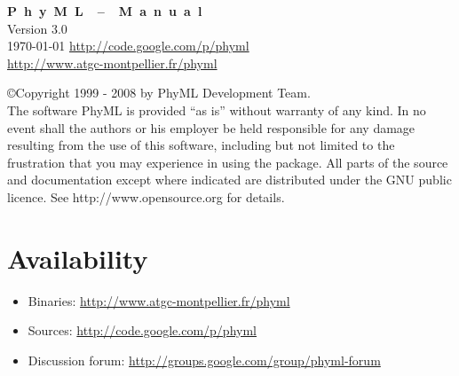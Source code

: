 \documentclass[a4paper,12pt]{article}
\begin{document}
\sloppy
\begin{center}
\thispagestyle{empty}
\vfill\vfill
{\Huge \textbf{ P~h~y~M~L~~--~~M~a~n~u~a~l}}
\vspace{-0.4cm}\\
\vfill
{\huge Version 3.0 \\
\today
\vfill
\normalsize
\href{http://code.google.com/p/phyml}{http://code.google.com/p/phyml}\\
\vspace{0.4cm}
\href{http://www.atgc-montpellier.fr/phyml}{http://www.atgc-montpellier.fr/phyml}}
\end{center}
\clearpage
\tableofcontents
\clearpage

{\par
\small 
\noindent
\copyright Copyright 1999 - 2008 by PhyML Development Team.\\
\noindent The software PhyML is provided ``as is''  without warranty of any kind.  In no event shall
the authors  or his  employer be  held responsible  for any damage  resulting from  the use  of this
software, including but not limited to the frustration that you may experience in using the package.
All parts of the source and documentation except where indicated are distributed under
the GNU public licence. See http://www.opensource.org for details.

}

{
\noindent
\setlength{\baselineskip}{0.5\baselineskip}
\section{Availability}
\begin{itemize}
\item Binaries: \href{http://www.atgc-montpellier.fr/phyml}{http://www.atgc-montpellier.fr/phyml}
\item Sources: \href{http://code.google.com/p/phyml}{http://code.google.com/p/phyml}
\item Discussion forum: \href{http://groups.google.com/group/phyml-forum}{http://groups.google.com/group/phyml-forum}
\end{itemize}
}
\end{document}

